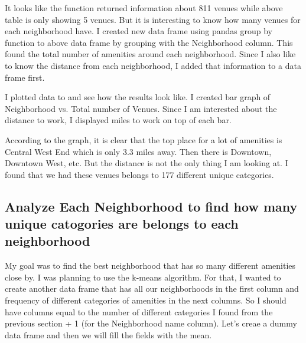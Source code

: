 \documentclass[11pt]{article}
\begin{document}
    
   \begin{center}
    \end{center}
   
            
    It looks like the function returned information about 811 venues while above table is only showing 5 venues. But it is interesting to know how many venues for each neighborhood have. I created new data frame using pandas group by function to above data frame by grouping with the Neighborhood column.  This found the total number of amenities around each neighborhood. Since I also like to know the distance from each neighborhood, I added that information to a data frame first.

\begin{center}
    \end{center}

            
I plotted data to and see how the results look like. I created bar graph of
Neighborhood vs. Total number of Venues. Since I am interested about the distance to work, I displayed miles to work on top of each bar.


    \begin{center}
    \end{center}
   
    
    According to the graph, it is clear that the top place for a lot of
amenities is Central West End which is only 3.3 miles away. Then there
is Downtown, Downtown West, etc. But the distance is not the only thing
I am looking at. I found that we had these venues belongs to 177 different unique categories.

\newpage
    \hypertarget{analyze-each-neighborhood-to-find-how-many-unique-catogories-are-belongs-to-each-neighborhood}{%
\subsection{Analyze Each Neighborhood to find how many unique
catogories are belongs to each
neighborhood}\label{analyze-each-neighborhood-to-find-how-many-unique-catogories-are-belongs-to-each-neighborhood}}

    My goal was to find the best neighborhood that has so many different
amenities close by. I was planning to use the k-means algorithm. For
that, I wanted to create another data frame that has all our
neighborhoods in the first column and frequency of different categories
of amenities in the next columns. So I should have columns equal to the
number of different categories I found from the previous section + 1
(for the Neighborhood name column). Let's creae a dummy data frame and
then we will fill the fields with the mean.
          
\end{document}
